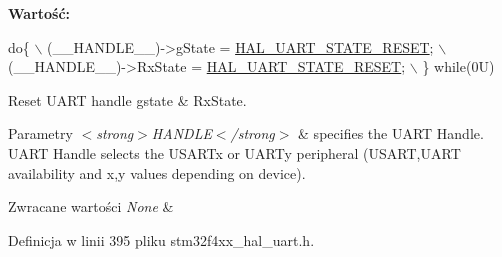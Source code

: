 {\bfseries Wartość\+:}
\begin{DoxyCode}
\textcolor{keywordflow}{do}\{                                                   \(\backslash\)
                                                       (\_\_HANDLE\_\_)->gState = 
      \hyperlink{group___u_a_r_t___exported___types_ggaf55d844a35379c204c90be5d1e8e50baa9c7d889fce61ccc717228d099a61d113}{HAL\_UART\_STATE\_RESET};      \(\backslash\)
                                                       (\_\_HANDLE\_\_)->RxState = 
      \hyperlink{group___u_a_r_t___exported___types_ggaf55d844a35379c204c90be5d1e8e50baa9c7d889fce61ccc717228d099a61d113}{HAL\_UART\_STATE\_RESET};     \(\backslash\)
                                                     \} \textcolor{keywordflow}{while}(0U)
\end{DoxyCode}


Reset U\+A\+RT handle gstate \& Rx\+State. 


\begin{DoxyParams}{Parametry}
{\em $<$strong$>$\+H\+A\+N\+D\+L\+E$<$/strong$>$} & specifies the U\+A\+RT Handle. U\+A\+RT Handle selects the U\+S\+A\+R\+Tx or U\+A\+R\+Ty peripheral (U\+S\+A\+RT,U\+A\+RT availability and x,y values depending on device). \\
\hline
\end{DoxyParams}

\begin{DoxyRetVals}{Zwracane wartości}
{\em None} & \\
\hline
\end{DoxyRetVals}


Definicja w linii 395 pliku stm32f4xx\+\_\+hal\+\_\+uart.\+h.

